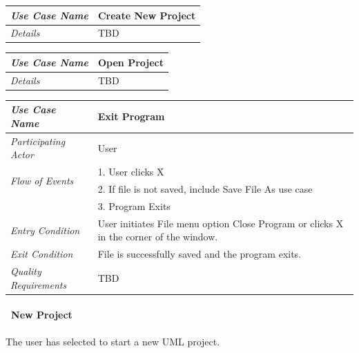 \documentclass[twoside,letterpaper]{article}
\begin{document}
\begin{flushleft}
\tablehead{}
\begin{tabular}{|m{2.0in} m{5.0in}|}
\hline
{\bfseries\emph{Use Case Name}}
& {\bfseries
Create New Project}
\\\hline
\emph{Details}
& TBD
\\\hline
\end{tabular}
\end{flushleft}
\bigskip

\begin{flushleft}
\tablehead{}
\begin{tabular}{|m{2.0in} m{5.0in}|}
\hline
{\bfseries\emph{Use Case Name}}
& {\bfseries Open Project}
\\\hline
\emph{Details}
& TBD
\\\hline
\end{tabular}
\end{flushleft}
\bigskip

\begin{flushleft}
\tablehead{}
\begin{tabular}{|m{2.0in} m{5.0in}|}
\hline
{\bfseries\emph{Use Case Name}}
& {\bfseries Exit Program}
\\\hline
\emph{Participating Actor}
& User
\\\hline
\multirow{2}{*}{\emph{Flow of Events}}
& 1. User clicks X \\
& 2. If file is not saved, include Save File As use case \\
& 3. Program Exits \\\hline
\emph{Entry Condition}
&
User initiates File menu option Close Program or clicks X in the corner of the window.
\\\hline
\emph{Exit Condition}
& File is successfully saved and the program exits.
\\\hline
\emph{Quality Requirements}
& TBD
\\\hline
\end{tabular}
\end{flushleft}
\bigskip

\clearpage

\paragraph[\ Use Category]
{\ New Project} 
{The user has selected to start a new UML project.}
\end{document}
